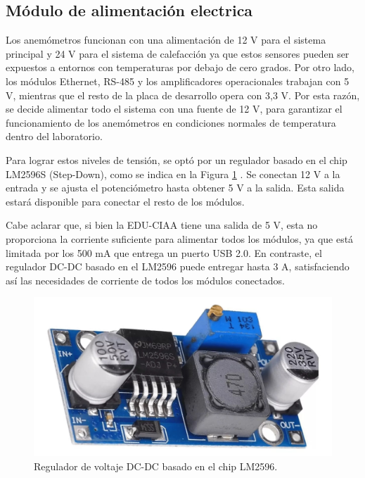 \subsection{Módulo de alimentación electrica}\label{sec:moduloAlimentacionElectrica}

Los anemómetros funcionan con una alimentación de 12 \unit{\volt} para el sistema principal y 24 \unit{\volt} para el sistema de calefacción ya que estos sensores pueden ser expuestos a entornos con temperaturas por debajo de cero grados. Por otro lado, los módulos Ethernet, RS-485 y los amplificadores operacionales trabajan con 5 \unit{\volt}, mientras que el resto de la placa de desarrollo opera con 3,3 \unit{\volt}. Por esta razón, se decide alimentar todo el sistema con una fuente de 12 \unit{\volt}, para garantizar el funcionamiento de los anemómetros en condiciones normales de temperatura dentro del laboratorio.

Para lograr estos niveles de tensión, se optó por un regulador basado en el chip LM2596S (Step-Down), como se indica en la Figura \ref{fig:StepDowmLM2596S}
. Se conectan 12 \unit{\volt} a la entrada y se ajusta el potenciómetro hasta obtener 5 \unit{\volt} a la salida. Esta salida estará disponible para conectar el resto de los módulos.

Cabe aclarar que, si bien la EDU-CIAA tiene una salida de 5 \unit{\volt}, esta no proporciona la corriente suficiente para alimentar todos los módulos, ya que está limitada por los 500 \unit{\milli\ampere} que entrega un puerto USB 2.0. En contraste, el regulador DC-DC basado en el LM2596 puede entregar hasta 3 \unit{\ampere}, satisfaciendo así las necesidades de corriente de todos los módulos conectados. 

\begin{figure}[H]
    \centering
    \includegraphics[width=0.5\linewidth]{Figuras/datalogger/Hardware/StepDowmLM2596S.jpg}
    \caption{Regulador de voltaje DC-DC basado en el chip LM2596.}
    \label{fig:StepDowmLM2596S}
\end{figure}

